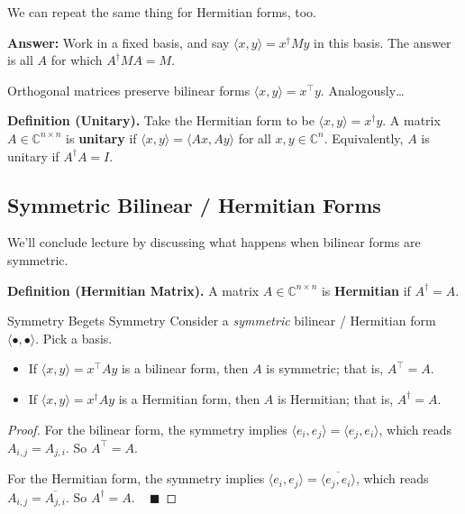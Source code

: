 We can repeat the same thing for Hermitian forms, too.

\textbf{Answer:} Work in a fixed basis, and say $\langle x, y \rangle = x^{\dagger}My$ in this basis.  The answer is all $A$ for which $A^{\dagger}MA = M$.

Orthogonal matrices preserve bilinear forms $\langle x, y \rangle = x^{\top}y$.  Analogously\dots

\textbf{Definition (Unitary).} Take the Hermitian form to be $\langle x, y \rangle = x^{\dagger}y$.  A matrix $A \in \mathbb{C}^{n \times n}$ is \textbf{unitary} if $\langle x, y \rangle = \langle Ax, Ay \rangle$ for all $x, y \in \mathbb{C}^n$.  Equivalently, $A$ is unitary if $A^{\dagger}A = I$.



\subsection{Symmetric Bilinear / Hermitian Forms}

We'll conclude lecture by discussing what happens when bilinear forms are symmetric.

\textbf{Definition (Hermitian Matrix).} A matrix $A \in \mathbb{C}^{n \times n}$ is \textbf{Hermitian} if $A^{\dagger} = A$.

\begin{theorem}{Symmetry Begets Symmetry}
    Consider a \emph{symmetric} bilinear / Hermitian form $\langle \bullet, \bullet \rangle$.  Pick a basis.
    \begin{itemize}
        \item If $\langle x, y \rangle = x^{\top}Ay$ is a bilinear form, then $A$ is symmetric; that is, $A^{\top} = A$.
        \item If $\langle x, y \rangle = x^{\dagger}Ay$ is a Hermitian form, then $A$ is Hermitian; that is, $A^{\dagger} = A$.
    \end{itemize}
\end{theorem}

\begin{proof}
    For the bilinear form, the symmetry implies $\langle e_i, e_j \rangle = \langle e_j, e_i\rangle$, which reads $A_{i, j} = A_{j, i}$.  So $A^{\top} = A$.

    For the Hermitian form, the symmetry implies $\langle e_i, e_j \rangle = \overline{\langle e_j, e_i \rangle}$, which reads $A_{i, j} = \overline{A_{j, i}}$.  So $A^{\dagger} = A$. ~ $\blacksquare$
\end{proof}


